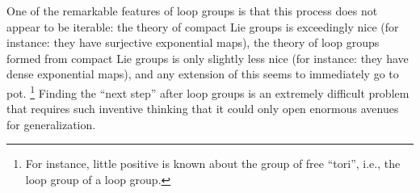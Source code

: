 One of the remarkable features of loop groups is that this process does not appear to be iterable: the theory of compact Lie groups is exceedingly nice (for instance: they have surjective exponential maps), the theory of loop groups formed from compact Lie groups is only slightly less nice (for instance: they have dense exponential maps), and any extension of this seems to immediately go to pot.%
\footnote{%
For instance, little positive is known about the group of free ``tori'', i.e., the loop group of a loop group.
}
Finding the ``next step'' after loop groups is an extremely difficult problem that requires such inventive thinking that it could only open enormous avenues for generalization.








